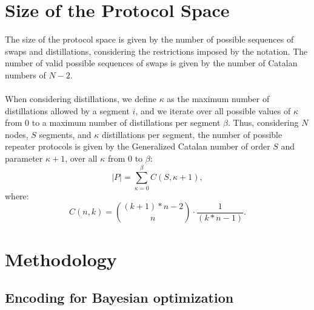 \documentclass{article}
\begin{document}
\section*{Size of the Protocol Space}

The size of the protocol space is given by the number of possible sequences of swaps and distillations, considering the restrictions imposed by the notation. The number of valid possible sequences of swaps is given by the number of Catalan numbers of $N-2$.
\\\\
When considering distillations, we define $\kappa$ as the maximum number of distillations allowed by a segment ${{i}}$, and we iterate over all possible values of $\kappa$ from 0 to a maximum number of distillations per segment $\beta$.
Thus, considering $N$ nodes, $S$ segments, and $\kappa$ distillations per segment, the number of possible repeater protocols is given by the Generalized Catalan number \footnotemark[1] of order $S$ and parameter $\kappa+1$, over all $\kappa$ from 0 to $\beta$:
\begin{equation}
    |P| = \sum_{\kappa=0}^{\beta} C(S, \kappa+1) ,
\end{equation}
where:
\begin{equation}
    C(n,k)= \binom{(k+1)*n-2}{n} \cdot \frac{1}{(k*n-1)} .
\end{equation}

\section*{Methodology}

\subsection*{Encoding for Bayesian optimization}
\end{document}
